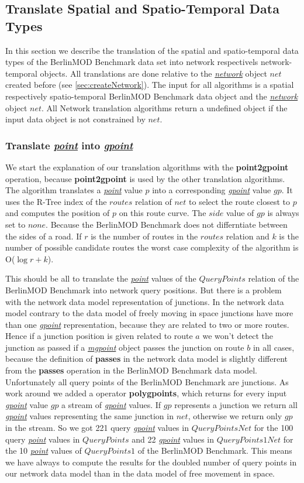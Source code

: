 \documentclass[a4paper]{article}
\newcommand{\bmodb} {BerlinMOD Benchmark}
\newcommand{\op}[1]{\textbf{#1}}
\newcommand{\dt}[1]{\textsl{\underline{#1}}}
\begin{document}
{\subsection{Translate Spatial and Spatio-Temporal Data Types}
\label{sec:translateSTdata}
In this section we describe the translation of the spatial and spatio-temporal
data types of the \bmodb{} data set into network respectivels network-temporal
objects. All translations are done relative to the \dt{network} object $net$ created
before (see  \ref{sec:createNetwork}).
The input for all algorithms is a spatial respectively
spatio-temporal \bmodb{} data object and the \dt{network} object $net$.
All Network translation algorithms return a undefined object if the input data
object is not constrained by $net$.

\subsubsection{Translate \dt{point} into \dt{gpoint}}
We start the explanation of our translation algorithms with the \op{point2gpoint}
operation, because \op{point2gpoint} is used by the other translation algorithms.
The algorithm translates a \dt{point} value $p$ into a corresponding
\dt{gpoint} value $gp$. It uses the R-Tree index of the
$routes$ relation of $net$ to select the route closest to $p$ and computes the
position of $p$ on this route curve. The $side$ value of $gp$ is always set
to $none$. Because the \bmodb{} does not differntiate between the sides of a
road. If $r$ is the number of routes in the $routes$ relation
and $k$ is the number of possible candidate routes the worst case complexity
of the algorithm is O($\log{r} + k$).

This should be all to translate the \dt{point} values of the $QueryPoints$
relation of the \bmodb{} into network query positions. But there is a problem with
the network data model representation of junctions. In the network data model
contrary to the data model of freely moving in space junctions have more than one
\dt{gpoint} representation, because they are related to two or more routes. Hence
if a junction position is given related to route $a$ we won't detect the
junction as passed if a \dt{mgpoint} object passes the junction on route $b$
in all cases, because the definition of \op{passes} in the network data model is
slightly different from the \op{passes} operation in the \bmodb{} data model.
Unfortunately all query points of the \bmodb{} are junctions. As work around we
added a operator \op{polygpoints}, which returns for every input \dt{gpoint}
value $gp$ a stream of \dt{gpoint} values. If $gp$ represents a junction
we return all \dt{gpoint} values representing the same junction in $net$,
otherwise we return only $gp$ in the stream. So we got 221 query \dt{gpoint}
values in $QueryPointsNet$ for the 100 query \dt{point} values in
$QueryPoints$ and 22 \dt{gpoint} values in $QueryPoints1Net$ for the
10 \dt{point} values of $QueryPoints1$ of the \bmodb{}. This means we have
always to compute the results for the doubled number of query points in our network
data model than in the data model of free movement in space.

}
\end{document}
